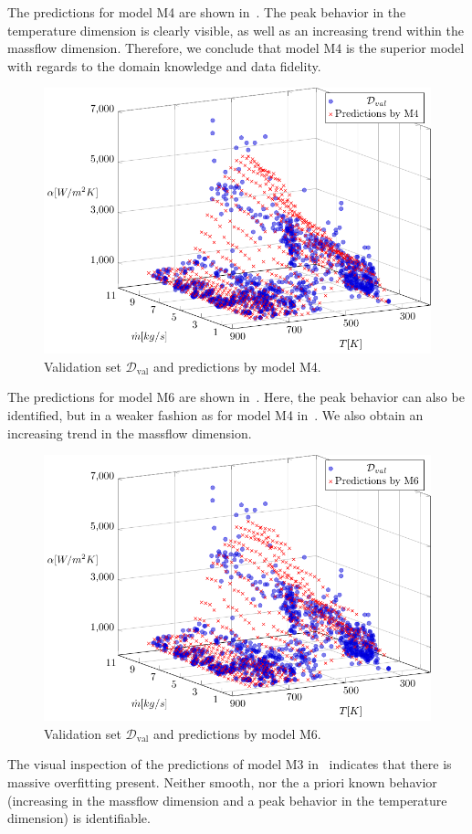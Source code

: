 The predictions for model M4 are shown in~. The peak behavior in the temperature dimension is clearly visible, as well as an increasing trend within the massflow dimension. Therefore, we conclude that model M4 is the superior model with regards to the domain knowledge and data fidelity. 

\begin{figure}[H]
	\centering
	\includegraphics[width=\columnwidth]{graphics/pgfplots/cha5/M4.pdf}
	\caption{Validation set $\mathcal{D}_{\text{val}}$ and predictions by model M4.}
	\label{fig:ebner-M4}
\end{figure}

The predictions for model M6 are shown in~. Here, the peak behavior can also be identified, but in a weaker fashion as for model M4 in~. We also obtain an increasing trend in the massflow dimension. 

\begin{figure}[H]
	\centering
	\includegraphics[width=\columnwidth]{graphics/pgfplots/cha5/M6.pdf}
	\caption{Validation set $\mathcal{D}_{\text{val}}$ and predictions by model M6.}
	\label{fig:ebner-M6}
\end{figure}
%
The visual inspection of the predictions of model M3 in~ indicates that there is massive overfitting present. Neither smooth, nor the a priori known behavior (increasing in the massflow dimension and a peak behavior in the temperature dimension) is identifiable.  

